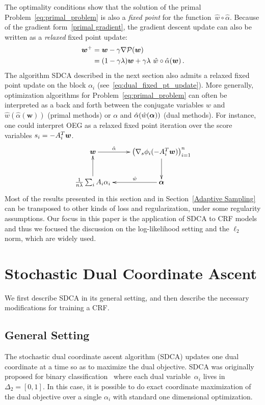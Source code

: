 The optimality conditions show that the solution of the primal Problem~\eqref{eq:primal_problem} is also a \emph{fixed point} for the function~$\hat w \circ \hat \alpha$.
Because of the gradient form~\eqref{primal gradient}, the gradient descent update can also be written as a \emph{relaxed} fixed point update:
\begin{align}
		\boldsymbol{w}^+
		& = \boldsymbol{w} - \gamma \nabla {\mathcal P}(\boldsymbol{w}) \\
		& = (1-\gamma \lambda) \boldsymbol{w}  + \gamma \lambda \,\, \hat w \circ \hat \alpha (\boldsymbol{w}) \, .
\end{align}
The algorithm SDCA described in the next section also admits a relaxed fixed point update on the block $\alpha_i$ (see~\eqref{eq:dual_fixed_pt_update}).
More generally, optimization algorithms for Problem~\eqref{eq:primal_problem} can often be interpreted as a back and forth between the conjugate variables $w$ and $\hat w(\hat \alpha(\bm w))$ (primal methods) or $\alpha$ and $\hat \alpha(\hat w( \boldsymbol{\alpha}))$ (dual methods).
For instance, one could interpret OEG as a relaxed fixed point iteration over the score variables $s_i = -A_i^T\boldsymbol{w}$.
\begin{displaymath}
    \xymatrix{
    	\bm w \ar[r]^-{\hat{\alpha}}
    	&   \left( \nabla_s \phi_i(-A_i^T \bm w) \right)_{i=1}^n \ar[d] \\
		\frac{1}{n \lambda} \sum_i A_i \alpha_i  \ar[u]
		&  \balpha \ar[l]_-{\hat{w}}
	}
\end{displaymath}
Most of the results presented in this section and in Section~\ref{Adaptive Sampling} can be transposed to other kinds of loss and regularization, under some regularity assumptions.
Our focus in this paper is the application of SDCA to CRF models and thus we focused the discussion on the log-likelihood setting and the $\ell_2$ norm, which are widely used.


\section{Stochastic Dual Coordinate Ascent} \label{sec:SDCA}

We first describe SDCA in its general setting, and then describe the necessary modifications for training a CRF.

\subsection{General Setting}
The stochastic dual coordinate ascent algorithm (SDCA) updates one dual coordinate at a time so as to maximize the dual objective.
SDCA was originally proposed for binary classification~\citep{shalev-shwartz_stochastic_2013} where each dual variable~$\alpha_i$ lives in $\Delta_2 = [0,1]$.
In this case, it is possible to do exact coordinate maximization of the dual objective over a single $\alpha_i$ with standard one dimensional optimization.


